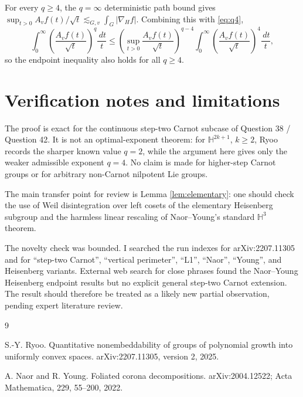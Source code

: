 \documentclass[11pt]{article}
\newcommand{\HH}{\mathbb H}
\newcommand{\dd}{\,d}
\newcommand{\abs}[1]{\left\lvert #1\right\rvert}
\begin{document}
For every \(q\geq 4\), the \(q=\infty\) deterministic path bound gives
\(\sup_{t>0} A_vf(t)/\sqrt t\lesssim_{G,v}\int_G\abs{\nabla_H f}\). Combining this with
\eqref{eq:q4},
\[
\int_0^\infty \left(\frac{A_vf(t)}{\sqrt t}\right)^q\frac{\dd t}{t}
\leq
\left(\sup_{t>0}\frac{A_vf(t)}{\sqrt t}\right)^{q-4}
\int_0^\infty \left(\frac{A_vf(t)}{\sqrt t}\right)^4\frac{\dd t}{t},
\]
so the endpoint inequality also holds for all \(q\geq 4\).

\section*{Verification notes and limitations}

The proof is exact for the continuous step-two Carnot subcase of Question 38 / Question 42.
It is not an optimal-exponent theorem: for \(\HH^{2k+1}\), \(k\geq 2\), Ryoo records the sharper
known value \(q=2\), while the argument here gives only the weaker admissible exponent \(q=4\).
No claim is made for higher-step Carnot groups or for arbitrary non-Carnot nilpotent Lie groups.

The main transfer point for review is Lemma \ref{lem:elementary}: one should check the use of
Weil disintegration over left cosets of the elementary Heisenberg subgroup and the harmless
linear rescaling of Naor--Young's standard \(\HH^3\) theorem.

The novelty check was bounded. I searched the run indexes for arXiv:2207.11305 and for
``step-two Carnot'', ``vertical perimeter'', ``L1'', ``Naor'', ``Young'', and Heisenberg variants.
External web search for close phrases found the Naor--Young Heisenberg endpoint results but no
explicit general step-two Carnot extension. The result should therefore be treated as a likely new
partial observation, pending expert literature review.

\begin{thebibliography}{9}

S.-Y. Ryoo.
\newblock Quantitative nonembeddability of groups of polynomial growth into uniformly convex spaces.
\newblock arXiv:2207.11305, version 2, 2025.

A. Naor and R. Young.
\newblock Foliated corona decompositions.
\newblock arXiv:2004.12522; Acta Mathematica, 229, 55--200, 2022.

\end{thebibliography}
\end{document}
